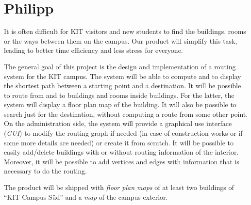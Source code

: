 \section{Philipp}

It is often difficult for KIT visitors and new students to find the buildings, rooms or the ways between them on the campus. Our product will simplify this task, leading to better time efficiency and less stress for everyone.

The general goal of this project is the design and implementation of a routing system for the KIT campus. The system will be able to compute and to display the shortest path between a starting point and a destination. It will be possible to route from and to buildings and rooms inside buildings. For the latter, the system will display a floor plan map of the building. It will also be possible to search just for the destination, without computing a route from some other point. \\

\noindent On the administration side, the system will provide a graphical use interface (\textit{GUI}) to modify the routing graph if needed (in case of construction works or if some more details are needed) or create it from scratch. It will be possible to easily add/delete buildings with or without routing information of the interior. Moreover, it will be possible to add vertices and edges with information that is necessary to do the routing.

The product will be shipped with \textit{floor plan maps} of at least two buildings of ``KIT Campus Süd'' and a \textit{map} of the campus exterior.



%
%
%



